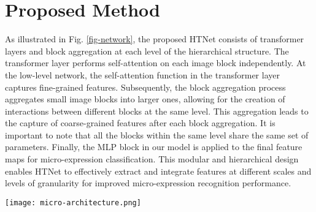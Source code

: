 \documentclass[review,12pt, 3p]{elsarticle}
\begin{document}
\section{Proposed Method}
As illustrated in Fig. \ref{fig-network}, the proposed HTNet consists of transformer layers and block aggregation at each level of the hierarchical structure. The transformer layer performs self-attention on each image block independently. At the low-level network, the self-attention function in the transformer layer captures fine-grained features. Subsequently, the block aggregation process aggregates small image blocks into larger ones, allowing for the creation of interactions between different blocks at the same level. This aggregation leads to the capture of coarse-grained features after each block aggregation. It is important to note that all the blocks within the same level share the same set of parameters. Finally, the MLP block in our model is applied to the final feature maps for micro-expression classification. This modular and hierarchical design enables HTNet to effectively extract and integrate features at different scales and levels of granularity for improved micro-expression recognition performance.
\begin{figure*}[t]
\centering
  \texttt{[image: micro-architecture.png]}
  \caption{HTNet: Overall architectures of hierarchical transformer network for micro-expression recognition.  Low-level self-attention in transformer layers captures fine-grained features in local regions. High-level self-attention in transformer layers captures coarse-grained features in global regions. An aggregation block is proposed to create interactions between different blocks at the same level.}
  \label{fig-network}
\end{figure*}
\end{document}
